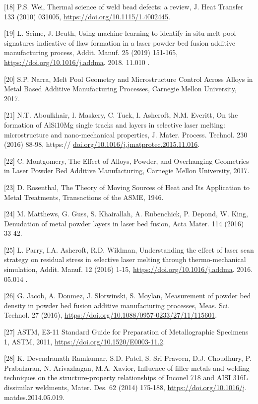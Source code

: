 \documentclass[10pt]{article}
\begin{document}
[18] P.S. Wei, Thermal science of weld bead defects: a review, J. Heat Transfer 133 (2010) 031005, \href{https://doi.org/10.1115/1.4002445}{https://doi.org/10.1115/1.4002445}.

[19] L. Scime, J. Beuth, Using machine learning to identify in-situ melt pool signatures indicative of flaw formation in a laser powder bed fusion additive manufacturing process, Addit. Manuf. 25 (2019) 151-165, \href{https://doi.org/10.1016/j.addma}{https://doi.org/10.1016/j.addma}. 2018. 11.010 .

[20] S.P. Narra, Melt Pool Geometry and Microstructure Control Across Alloys in Metal Based Additive Manufacturing Processes, Carnegie Mellon University, 2017.

[21] N.T. Aboulkhair, I. Maskery, C. Tuck, I. Ashcroft, N.M. Everitt, On the formation of AlSi10Mg single tracks and layers in selective laser melting: microstructure and nano-mechanical properties, J. Mater. Process. Technol. 230 (2016) 88-98, https:// \href{http://doi.org/10.1016/j.jmatprotec.2015.11.016}{doi.org/10.1016/j.jmatprotec.2015.11.016}.

[22] C. Montgomery, The Effect of Alloys, Powder, and Overhanging Geometries in Laser Powder Bed Additive Manufacturing, Carnegie Mellon University, 2017.

[23] D. Rosenthal, The Theory of Moving Sources of Heat and Its Application to Metal Treatments, Transactions of the ASME, 1946.

[24] M. Matthews, G. Guss, S. Khairallah, A. Rubenchick, P. Depond, W. King, Denudation of metal powder layers in laser bed fusion, Acta Mater. 114 (2016) 33-42.

[25] L. Parry, I.A. Ashcroft, R.D. Wildman, Understanding the effect of laser scan strategy on residual stress in selective laser melting through thermo-mechanical simulation, Addit. Manuf. 12 (2016) 1-15, \href{https://doi.org/10.1016/j.addma}{https://doi.org/10.1016/j.addma}. 2016. 05.014 .

[26] G. Jacob, A. Donmez, J. Slotwinski, S. Moylan, Measurement of powder bed density in powder bed fusion additive manufacturing processes, Meas. Sci. Technol. 27 (2016), \href{https://doi.org/10.1088/0957-0233/27/11/115601}{https://doi.org/10.1088/0957-0233/27/11/115601}.

[27] ASTM, E3-11 Standard Guide for Preparation of Metallographic Specimens 1, ASTM, 2011, \href{https://doi.org/10.1520/E0003-11.2}{https://doi.org/10.1520/E0003-11.2}.

[28] K. Devendranath Ramkumar, S.D. Patel, S. Sri Praveen, D.J. Choudhury, P. Prabaharan, N. Arivazhagan, M.A. Xavior, Influence of filler metals and welding techniques on the structure-property relationships of Inconel 718 and AISI 316L dissimilar weldments, Mater. Des. 62 (2014) 175-188, \href{https://doi.org/10.1016/j}{https://doi.org/10.1016/j}. matdes.2014.05.019.
\end{document}
